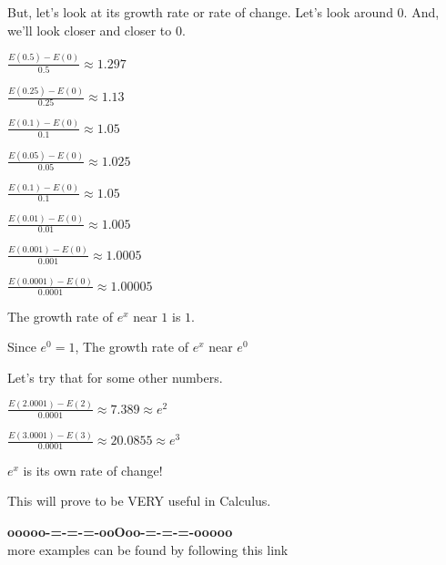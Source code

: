 \documentclass{ximera}
\begin{document}
But, let's look at its growth rate or rate of change. Let's look around $0$. And, we'll look closer and closer to $0$.


$\frac{E(0.5)-E(0)}{0.5} \approx 1.297$

$\frac{E(0.25)-E(0)}{0.25} \approx 1.13$

$\frac{E(0.1)-E(0)}{0.1} \approx 1.05$

$\frac{E(0.05)-E(0)}{0.05} \approx 1.025$

$\frac{E(0.1)-E(0)}{0.1} \approx 1.05$

$\frac{E(0.01)-E(0)}{0.01} \approx 1.005$

$\frac{E(0.001)-E(0)}{0.001} \approx 1.0005$

$\frac{E(0.0001)-E(0)}{0.0001} \approx 1.00005$

The growth rate of $e^x$ near $1$ is $1$.

Since $e^0 = 1$, The growth rate of $e^x$ near $e^0$ 


Let's try that for some other numbers.


$\frac{E(2.0001)-E(2)}{0.0001} \approx 7.389 \approx e^2$


$\frac{E(3.0001)-E(3)}{0.0001} \approx 20.0855 \approx e^3$




$e^x$ is its own rate of change!

This will prove to be VERY useful in Calculus.




\begin{center}
\textbf{\textcolor{green!50!black}{ooooo-=-=-=-ooOoo-=-=-=-ooooo}} \\

more examples can be found by following this link\\ 

\end{center}
\end{document}

